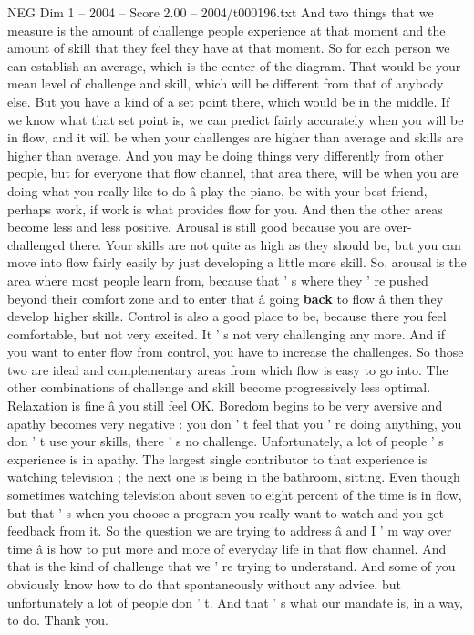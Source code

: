 \begin{textsample}{NEG Dim 1 – 2004 – Score 2.00 – 2004/t000196.txt}
And two things that we measure is the amount of challenge people experience at that moment and the amount of skill that they feel they have at that moment.
So for each person we can establish an average, which is the center of the diagram.
That would be your mean level of challenge and skill, which will be different from that of anybody else.
But you have a kind of a set point there, which would be in the middle.
If we know what that set point is, we can predict fairly accurately when you will be in flow, and it will be when your challenges are higher than average and skills are higher than average.
And you may be doing things very differently from other people, but for everyone that flow channel, that area there, will be when you are doing what you really like to do â play the piano, be with your best friend, perhaps work, if work is what provides flow for you.
And then the other areas become less and less positive.
Arousal is still good because you are over-challenged there.
Your skills are not quite as high as they should be, but you can move into flow fairly easily by just developing a little more skill.
So, arousal is the area where most people learn from, because that ' s where they ' re pushed beyond their comfort zone and to enter that â going \textbf{back} to flow â then they develop higher skills.
Control is also a good place to be, because there you feel comfortable, but not very excited.
It ' s not very challenging any more.
And if you want to enter flow from control, you have to increase the challenges.
So those two are ideal and complementary areas from which flow is easy to go into.
The other combinations of challenge and skill become progressively less optimal.
Relaxation is fine â you still feel OK.
Boredom begins to be very aversive and apathy becomes very negative : you don ' t feel that you ' re doing anything, you don ' t use your skills, there ' s no challenge.
Unfortunately, a lot of people ' s experience is in apathy.
The largest single contributor to that experience is watching television ; the next one is being in the bathroom, sitting.
Even though sometimes watching television about seven to eight percent of the time is in flow, but that ' s when you choose a program you really want to watch and you get feedback from it.
So the question we are trying to address â and I ' m way over time â is how to put more and more of everyday life in that flow channel.
And that is the kind of challenge that we ' re trying to understand.
And some of you obviously know how to do that spontaneously without any advice, but unfortunately a lot of people don ' t.
And that ' s what our mandate is, in a way, to do.
Thank you.

\end{textsample}
